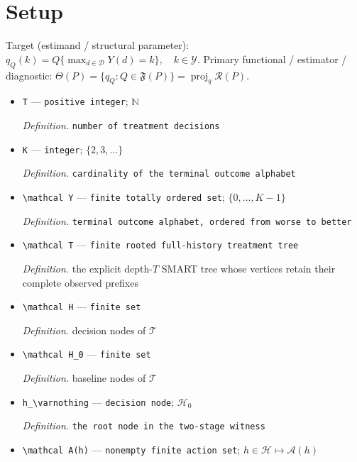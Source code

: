 \documentclass{article}
\begin{document}
\section{Setup}

Target (estimand / structural parameter): \(q_Q(k)=Q\{\max_{d\in\mathcal D}Y(d)=k\},\quad k\in\mathcal Y\).
Primary functional / estimator / diagnostic: \(\Theta(P)=\{q_Q:Q\in\mathfrak F(P)\}=\operatorname{proj}_{q}\mathcal R(P)\).
\begin{itemize}
  \item \texttt{T} --- \texttt{positive integer}; \(\mathbb N\)
  \par\smallskip\noindent\emph{Definition.} \texttt{number of treatment decisions}
  \item \texttt{K} --- \texttt{integer}; \(\{2,3,\ldots\}\)
  \par\smallskip\noindent\emph{Definition.} \texttt{cardinality of the terminal outcome alphabet}
  \item \texttt{\textbackslash{}\allowbreak{}mathcal Y} --- \texttt{finite totally ordered set}; \(\{0,\ldots,K-1\}\)
  \par\smallskip\noindent\emph{Definition.} \texttt{terminal outcome alphabet,\allowbreak{} ordered from worse to better}
  \item \texttt{\textbackslash{}\allowbreak{}mathcal T} --- \texttt{finite rooted full-\allowbreak{}history treatment tree}
  \par\smallskip\noindent\emph{Definition.} the explicit depth-\(T\) SMART tree whose vertices retain their complete observed prefixes
  \item \texttt{\textbackslash{}\allowbreak{}mathcal H} --- \texttt{finite set}
  \par\smallskip\noindent\emph{Definition.} decision nodes of \(\mathcal T\)
  \item \texttt{\textbackslash{}\allowbreak{}mathcal H\_\allowbreak{}0} --- \texttt{finite set}
  \par\smallskip\noindent\emph{Definition.} baseline nodes of \(\mathcal T\)
  \item \texttt{h\_\allowbreak{}\textbackslash{}\allowbreak{}varnothing} --- \texttt{decision node}; \(\mathcal H_0\)
  \par\smallskip\noindent\emph{Definition.} \texttt{the root node in the two-\allowbreak{}stage witness}
  \item \texttt{\textbackslash{}\allowbreak{}mathcal A(h)} --- \texttt{nonempty finite action set}; \(h\in\mathcal H\mapsto\mathcal A(h)\)

\end{itemize}
\end{document}
